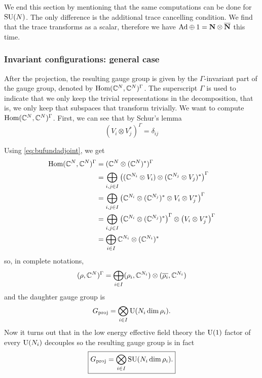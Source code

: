             We end this section by mentioning that the same computations can be done for $\text{SU}(N)$. The only difference is the additional trace cancelling condition. We find that the trace transforms as a scalar, therefore we have $\text{Ad}\oplus1=\textbf{N}\otimes\overline{\textbf{N}}$ this time.

        \subsubsection{Invariant configurations: general case}
            
            After the projection, the resulting gauge group is given by the $\Gamma$-invariant part of the gauge group, denoted by $\text{Hom}(\mathbb{C}^N,\mathbb{C}^N)^\Gamma$. The superscript $\Gamma$ is used to indicate that we only keep the trivial representations in the decomposition, that is, we only keep that subspaces that transform trivially. We want to compute $\text{Hom}(\mathbb{C}^N,\mathbb{C}^N)^\Gamma$. First, we can see that by Schur's lemma 
            \begin{equation}
                (V_i\otimes V^*_j)^\Gamma=\delta_{ij}
            \end{equation}
            
            Using \eqref{eq:bufundadjoint}, we get
            \begin{align}
                \text{Hom}(\mathbb{C}^N,\mathbb{C}^N)^\Gamma &= (\mathbb{C}^N\otimes(\mathbb{C}^N)^*)^\Gamma\\
                &= \bigoplus_{i,j\in I} \left((\mathbb{C}^{N_i}\otimes V_i)\otimes(\mathbb{C}^{N_j}\otimes V_j)^*\right)^\Gamma\\
                &= \bigoplus_{i,j\in I} \left(\mathbb{C}^{N_i}\otimes(\mathbb{C}^{N_j})^*\otimes V_i\otimes V^*_j\right)^\Gamma\\
                &= \bigoplus_{i,j\in I} \left(\mathbb{C}^{N_i}\otimes(\mathbb{C}^{N_j})^*\right)^\Gamma\otimes\left(V_i\otimes V^*_j\right)^\Gamma\\
                &= \bigoplus_{i\in I}\mathbb{C}^{N_i}\otimes(\mathbb{C}^{N_i})^*
            \end{align}
            so, in complete notations,
            \begin{equation}
                (\rho,\mathbb{C}^N)^\Gamma = \bigoplus_{i\in I}(\rho_i,\mathbb{C}^{N_i})\otimes(\overline{\rho_i},\mathbb{C}^{N_i})
            \end{equation}
            and the daughter gauge group is
            \begin{equation}
                G_{\text{proj}} = \bigotimes_{i\in I}\text{U}(N_i\dim\rho_i).
            \end{equation}
            Now it turns out that in the low energy effective field theory the $\text{U}(1)$ factor of every $\text{U}(N_i)$ decouples  so the resulting gauge group is in fact
            \begin{equation}
                \boxed{G_{\text{proj}} = \bigotimes_{i\in I}\text{SU}(N_i\dim\rho_i).}
            \end{equation}

